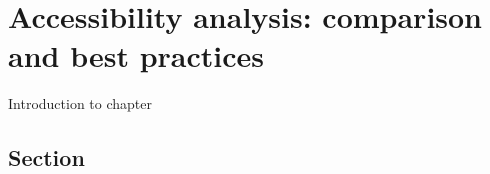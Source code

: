 \chapter{Accessibility analysis: comparison and best practices}
\label{chap:implementation}
Introduction to chapter

\section{Section}
\label{sec:fourth-section}

\newpage